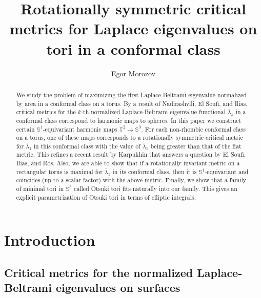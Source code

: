 \documentclass{amsart}
\title[Rotationally symmetric critical metrics on tori in a conformal class]
{Rotationally symmetric critical metrics for Laplace eigenvalues on tori in a
conformal class}
\author{Egor Morozov}
\theoremstyle{plain}
\theoremstyle{definition}
\theoremstyle{remark}
\begin{document}
\begin{abstract}
We study the problem of maximizing the first Laplace-Beltrami eigenvalue
normalized by area in a conformal class on a torus. By a result of Nadirashvili,
El Soufi, and Ilias, critical metrics for the \(k\)-th normalized
Laplace-Beltrami eigenvalue functional \(\bar\lambda_k\) in a conformal class
correspond to harmonic maps to spheres. In this paper we construct certain
\(\mathbb S^1\)-equivariant harmonic maps \(\mathbb T^2\to\mathbb S^3\). For
each non-rhombic conformal class on a torus, one of these maps corresponds to a
rotationally symmetric critical metric for \(\bar\lambda_1\) in this conformal
class with the value of \(\bar\lambda_1\) being greater than that of the flat
metric. This refines a recent result by Karpukhin that answers a question by El
Soufi, Ilias, and Ros. Also, we are able to show that if a rotationally
invariant metric on a rectangular torus is maximal for \(\bar\lambda_1\) in its
conformal class, then it is \(\mathbb S^1\)-equivariant and coincides (up to a
scalar factor) with the above metric. Finally, we show that a family of minimal
tori in \(\mathbb S^3\) called Otsuki tori fits naturally into our family. This
gives an explicit parametrization of Otsuki tori in terms of elliptic integrals.
\end{abstract}

\maketitle

\section{Introduction}

\subsection{Critical metrics for the normalized Laplace-Beltrami eigenvalues on
surfaces}
\end{document}
